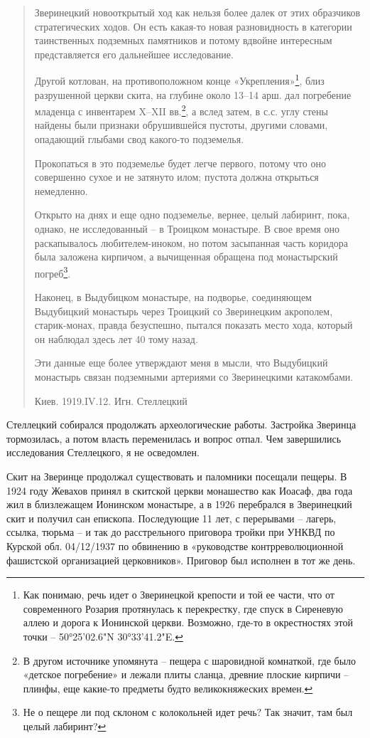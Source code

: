 \begin{quotation}
Зверинецкий новооткрытый ход как нельзя
более далек от этих образчиков стратегических ходов. Он есть какая-то новая разновидность в категории таинственных подземных памятников и потому вдвойне интересным представляется его дальнейшее исследование.

Другой котлован, на противоположном конце
«Укрепления»\footnote{Как понимаю, речь идет о Зверинецкой крепости и той ее части, что от современного Розария протянулась к перекрестку, где спуск в Сиреневую аллею и дорога к Ионинской церкви. Возможно, где-то в окрестностях этой точки – 50°25'02.6"N 30°33'41.2"E.}, близ разрушенной церкви скита, на глубине около 13–14 арш. дал погребение младенца с инвентарем X–XII вв.\footnote{В другом источнике упомянута – пещера с шаровидной комнаткой, где было «детское погребение» и лежали плиты сланца, древние плоские кирпичи – плинфы, еще какие-то предметы будто великокняжеских времен.}, а вслед затем, в с.с. углу стены найдены были признаки обрушившейся пустоты, другими словами, опадающий глыбами свод какого-то подземелья.

Прокопаться в это подземелье будет легче первого, потому что оно совершенно сухое и не затянуто илом; пустота должна открыться немедленно.

Открыто на днях и еще одно подземелье,
вернее, целый лабиринт, пока, однако, не исследованный – в Троицком монастыре.
В свое время оно раскапывалось любителем-иноком, но потом засыпанная часть коридора была заложена кирпичом, а вычищенная обращена под монастырский погреб\footnote{Не о пещере ли под склоном с колокольней идет речь? Так значит, там был целый лабиринт?}.

Наконец, в Выдубицком монастыре, на подворье, соединяющем Выдубицкий монастырь через Троицкий со Зверинецким акрополем, старик-монах, правда безуспешно, пытался показать место хода, который он наблюдал здесь лет 40 тому назад.

Эти данные еще более утверждают меня в
мысли, что Выдубицкий монастырь связан подземными артериями со Зверинецкими катакомбами. 

Киев. 1919.IV.12. Игн. Стеллецкий
\end{quotation}

Стеллецкий собирался продолжать археологические работы. Застройка Зверинца тормозилась, а потом власть переменилась и вопрос отпал. Чем завершились исследования Стеллецкого, я не осведомлен.

Скит на Зверинце продолжал существовать и паломники посещали пещеры. В 1924 году Жевахов принял в скитской церкви монашество как Иоасаф, два года жил в близлежащем Ионинском монастыре, а в 1926 перебрался в Зверинецкий скит и получил сан епископа. Последующие 11 лет, с перерывами – лагерь, ссылка, тюрьма – и так до расстрельного приговора тройки при УНКВД по Курской обл. 04/12/1937 по обвинению в «руководстве контрреволюционной фашистской организацией церковников». Приговор был исполнен в тот же день.

